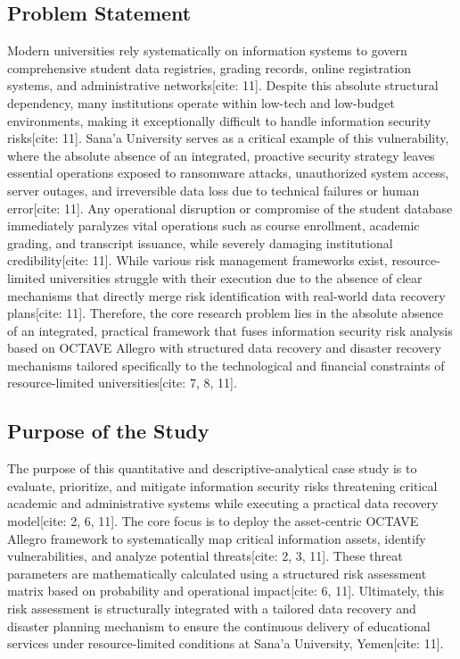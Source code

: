 \documentclass[journal,onecolumn,12pt,twoside]{IEEEtran}
\begin{document}
	\subsection{Problem Statement}
	\label{subsec:problem_statement}
	Modern universities rely systematically on information systems to govern comprehensive student data registries, grading records, online registration systems, and administrative networks[cite: 11]. Despite this absolute structural dependency, many institutions operate within low-tech and low-budget environments, making it exceptionally difficult to handle information security risks[cite: 11]. Sana'a University serves as a critical example of this vulnerability, where the absolute absence of an integrated, proactive security strategy leaves essential operations exposed to ransomware attacks, unauthorized system access, server outages, and irreversible data loss due to technical failures or human error[cite: 11]. Any operational disruption or compromise of the student database immediately paralyzes vital operations such as course enrollment, academic grading, and transcript issuance, while severely damaging institutional credibility[cite: 11]. While various risk management frameworks exist, resource-limited universities struggle with their execution due to the absence of clear mechanisms that directly merge risk identification with real-world data recovery plans[cite: 11]. Therefore, the core research problem lies in the absolute absence of an integrated, practical framework that fuses information security risk analysis based on OCTAVE Allegro with structured data recovery and disaster recovery mechanisms tailored specifically to the technological and financial constraints of resource-limited universities[cite: 7, 8, 11].
	
	\subsection{Purpose of the Study}
	\label{subsec:purpose}
	The purpose of this quantitative and descriptive-analytical case study is to evaluate, prioritize, and mitigate information security risks threatening critical academic and administrative systems while executing a practical data recovery model[cite: 2, 6, 11]. The core focus is to deploy the asset-centric OCTAVE Allegro framework to systematically map critical information assets, identify vulnerabilities, and analyze potential threats[cite: 2, 3, 11]. These threat parameters are mathematically calculated using a structured risk assessment matrix based on probability and operational impact[cite: 6, 11]. Ultimately, this risk assessment is structurally integrated with a tailored data recovery and disaster planning mechanism to ensure the continuous delivery of educational services under resource-limited conditions at Sana'a University, Yemen[cite: 11].
	
\end{document}
